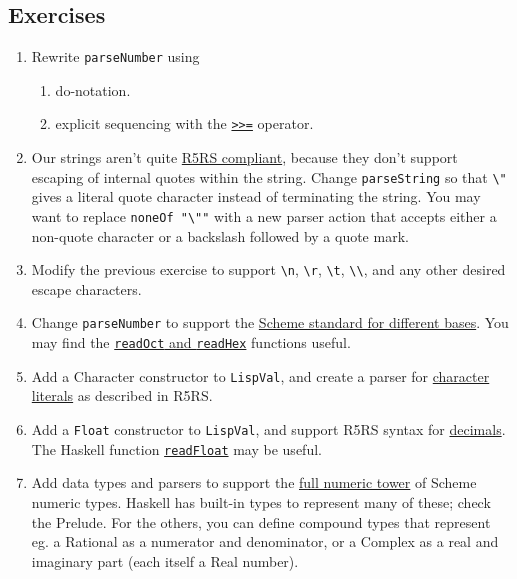 \subsection{Exercises}
 
\begin{enumerate}
	\item Rewrite \verb|parseNumber| using
	\begin{enumerate}
		\item do-notation.
		\item explicit sequencing with the \href{http://www.haskell.org/onlinereport/standard-prelude.html\#tMonad}{\texttt{>>=}} operator.
	\end{enumerate}
	\item Our strings aren't quite \href{http://www.schemers.org/Documents/Standards/R5RS/HTML/r5rs-Z-H-9.html\#\%_sec_6.3.5}{R5RS compliant}, because they don't support escaping of internal quotes within the string. Change \verb|parseString| so that \verb|\"| gives a literal quote character instead of terminating the string. You may want to replace \lstinline|noneOf "|\color{string}\verb|\"|\lstinline|"|\color{black} with a new parser action that accepts either a non-quote character or a backslash followed by a quote mark.
	\item Modify the previous exercise to support \verb|\n|, \verb|\r|, \verb|\t|, \verb|\\|, and any other desired escape characters.
	\item Change \verb|parseNumber| to support the \href{http://www.schemers.org/Documents/Standards/R5RS/HTML/r5rs-Z-H-9.html\#\%_sec_6.2.4}{Scheme standard for different bases}. You may find the \href{http://www.haskell.org/onlinereport/numeric.html\#sect14}{\texttt{readOct} and \texttt{readHex}} functions useful.
	\item Add a Character constructor to \verb|LispVal|, and create a parser for \href{http://www.schemers.org/Documents/Standards/R5RS/HTML/r5rs-Z-H-9.html\#\%_sec_6.3.4}{character literals} as described in R5RS.
	\item Add a \verb|Float| constructor to \verb|LispVal|, and support R5RS syntax for \href{http://www.schemers.org/Documents/Standards/R5RS/HTML/r5rs-Z-H-9.html\#\%_sec_6.2.4}{decimals}. The Haskell function \href{http://www.haskell.org/onlinereport/numeric.html\#sect14}{\texttt{readFloat}} may be useful.
	\item Add data types and parsers to support the \href{http://www.schemers.org/Documents/Standards/R5RS/HTML/r5rs-Z-H-9.html\#\%_sec_6.2.1}{full numeric tower} of Scheme numeric types. Haskell has built-in types to represent many of these; check the Prelude. For the others, you can define compound types that represent eg. a Rational as a numerator and denominator, or a Complex as a real and imaginary part (each itself a Real number).
\end{enumerate}
 
